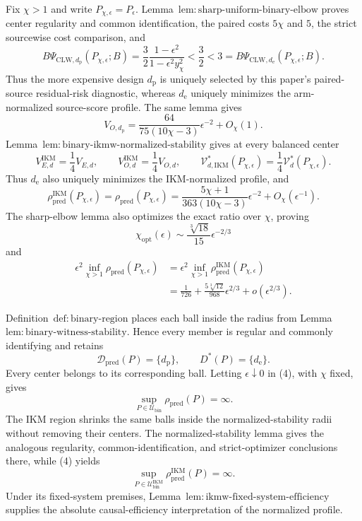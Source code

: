 Fix \(\chi>1\) and write \(P_{\chi,\epsilon}=P_\epsilon\).  Lemma~\(\mathrm{lem{:}sharp\text{-}uniform\text{-}binary\text{-}elbow}\) proves center regularity and common identification, the paired costs \(5\chi\) and \(5\), the strict sourcewise cost comparison, and
\[
 B\Psi_{\mathrm{CLW},d_{\mathrm p}}(P_{\chi,\epsilon};B)
 =\frac32\frac{1-\epsilon^2}{1-\epsilon^2y_\chi^2}
 <\frac32<3
 =B\Psi_{\mathrm{CLW},d_{\mathrm e}}(P_{\chi,\epsilon};B). \tag{1}
\]
Thus the more expensive design \(d_{\mathrm p}\) is uniquely selected by this paper's paired-source residual-risk diagnostic, whereas \(d_{\mathrm e}\) uniquely minimizes the arm-normalized source-score profile.  The same lemma gives
\[
 V_{O,d_{\mathrm p}}
 =\frac{64}{75(10\chi-3)}\epsilon^{-2}+O_\chi(1). \tag{2}
\]
Lemma~\(\mathrm{lem{:}binary\text{-}ikmw\text{-}normalized\text{-}stability}\) gives at every balanced center
\[
 V_{E,d}^{\mathrm{IKM}}=\frac14V_{E,d},
 \qquad V_{O,d}^{\mathrm{IKM}}=\frac14V_{O,d},
 \qquad \mathcal V_{d,\mathrm{IKM}}^*(P_{\chi,\epsilon})
 =\frac14\mathcal V_d^*(P_{\chi,\epsilon}). \tag{3}
\]
Thus \(d_{\mathrm e}\) also uniquely minimizes the IKM-normalized profile, and
\[
 \rho_{\mathrm{pred}}^{\mathrm{IKM}}(P_{\chi,\epsilon})
 =\rho_{\mathrm{pred}}(P_{\chi,\epsilon})
 =\frac{5\chi+1}{363(10\chi-3)}\epsilon^{-2}
 +O_\chi(\epsilon^{-1}). \tag{4}
\]
The sharp-elbow lemma also optimizes the exact ratio over \(\chi\), proving
\[
 \chi_{\mathrm{opt}}(\epsilon)
 \sim\frac{\sqrt[3]{18}}{15}\epsilon^{-2/3}
\]
and
\[
\begin{aligned}
 \epsilon^2\inf_{\chi>1}\rho_{\mathrm{pred}}(P_{\chi,\epsilon})
 &=\epsilon^2\inf_{\chi>1}\rho_{\mathrm{pred}}^{\mathrm{IKM}}(P_{\chi,\epsilon})\\
 &=\frac1{726}+\frac{5\sqrt[3]{12}}{968}\epsilon^{2/3}
 +o(\epsilon^{2/3}). \tag{5}
\end{aligned}
\]

Definition~\(\mathrm{def{:}binary\text{-}region}\) places each ball inside the radius from Lemma~\(\mathrm{lem{:}binary\text{-}witness\text{-}stability}\).  Hence every member is regular and commonly identifying and retains
\[
 \mathcal D_{\mathrm{pred}}(P)=\{d_{\mathrm p}\},
 \qquad D^*(P)=\{d_{\mathrm e}\}.
\]
Every center belongs to its corresponding ball.  Letting \(\epsilon\downarrow0\) in (4), with \(\chi\) fixed, gives
\[
 \sup_{P\in\mathcal U_{\mathrm{bin}}}\rho_{\mathrm{pred}}(P)=\infty. \tag{6}
\]
The IKM region shrinks the same balls inside the normalized-stability radii without removing their centers.  The normalized-stability lemma gives the analogous regularity, common-identification, and strict-optimizer conclusions there, while (4) yields
\[
 \sup_{P\in\mathcal U_{\mathrm{bin}}^{\mathrm{IKM}}}
 \rho_{\mathrm{pred}}^{\mathrm{IKM}}(P)=\infty. \tag{7}
\]
Under its fixed-system premises, Lemma~\(\mathrm{lem{:}ikmw\text{-}fixed\text{-}system\text{-}efficiency}\) supplies the absolute causal-efficiency interpretation of the normalized profile.

